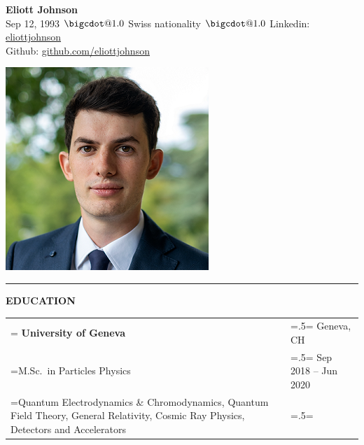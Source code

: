 \documentclass[letterpaper, 11pt]{article}
\makeatletter
\newcommand*\bigcdot{\mathpalette\bigcdot@{1.0}}
\newcommand*\bigcdot@[2]{\mathbin{\vcenter{\hbox{\scalebox{#2}{$\m@th#1\bullet$}}}}}
\makeatother
\begin{document}
\setlength\parindent{0pt}\textbf{}

\hfill%
\begin{minipage}{0.79\textwidth}\flushleft
\huge{\bf{Eliott Johnson}}\\
\normalsize
Sep 12, 1993 $\bigcdot$ Swiss nationality $\bigcdot$  Linkedin: \href{https://www.linkedin.com/in/eliottjohnson/}{eliottjohnson}\\Github:  \href{https://github.com/eliottjohnson}{github.com/eliottjohnson}
\end{minipage}
\begin{minipage}{0.19\textwidth}%
\includegraphics[width=\linewidth]{LinkedInProfilPic.png}
\end{minipage}%
\vspace{0.25cm}

\noindent\rule{\textwidth}{1pt}

\begin{center}
\large\bf{EDUCATION}
\end{center}

\begin{tabularx}{1.0\textwidth} { 
   >{\raggedright\arraybackslash\hsize=1.5\hsize\linewidth=\hsize}X 
   >{\raggedleft\arraybackslash\hsize=.5\hsize\linewidth=\hsize}X }
\normalsize
\bf{University of Geneva} & Geneva, CH \\
\normalfont M.Sc.\ in Particles Physics & Sep 2018 -- Jun 2020  \\  
Quantum Electrodynamics \& Chromodynamics, Quantum Field Theory, General Relativity, Cosmic Ray Physics, Detectors and Accelerators &
\end{tabularx}
\vspace{0.25cm}
\end{document}
